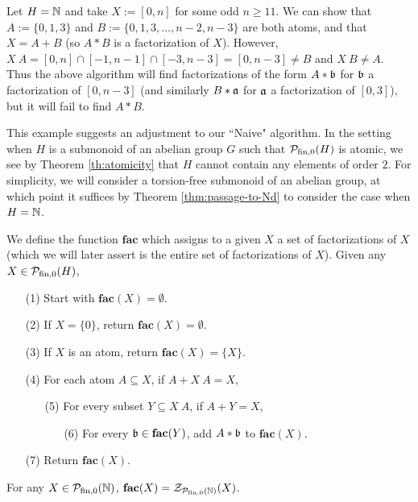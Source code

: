 \begin{eg}
Let $H = \NN$ and take $X := [0,n]$ for some odd $n \ge 11$.
We can show that $A := \{0,1,3\}$ and $B := \{0,1,3,\dots,n-2,n-3\}$ are both atoms, and that $X = A + B$ (so $A*B$ is a factorization of $X$).
However, $X\:A = [0,n] \cap [-1,n-1] \cap [-3,n-3] = [0,n-3] \neq B$ and $X\: B \neq A$.
Thus the above algorithm will find factorizations of the form $A*\bb$ for $\bb$ a factorization of $[0,n-3]$ (and similarly $B*\aa$ for $\aa$ a factorization of $[0,3]$), but it will fail to find $A*B$.
\end{eg} 

This example suggests an adjustment to our ``Naive" algorithm.
In the setting when $H$ is a submonoid of an abelian group $G$ such that $\P_\fon(H)$ is atomic, we see by Theorem \ref{th:atomicity} that $H$ cannot contain any elements of order $2$.
For simplicity, we will consider a torsion-free submonoid of an abelian group, at which point it suffices by Theorem \ref{thm:passage-to-Nd} to consider the case when $H = \NN$.

\begin{defn} \label{def:fac algorithm}
We define the function $\mathbf{fac}$ which assigns to a given $X$ a set of factorizations of $X$ (which we will later assert is the entire set of factorizations of $X$).
Given any $X\in \P_\fon(H)$,
\begin{itemize}
	\item[(1)] Start with $\mathbf{fac}(X) = \emptyset$.
	\item[(2)] If $X = \{0\}$, return $\mathbf{fac}(X) = \emptyset$.
	\item[(3)] If $X$ is an atom, return $\mathbf{fac}(X) = \{X\}$. 
	\item[(4)] For each atom $A \subseteq X$, if $A + X\:A = X$,
	\begin{itemize}
	\item[(5)] For every subset $Y \subseteq X\:A$, if $A+Y = X$,
	\begin{itemize}
		\item[(6)] For every $\bb\in \mathbf{fac}(Y)$, add $A*\bb$ to $\mathbf{fac}(X)$.
	\end{itemize}
\end{itemize}
\item[(7)] Return $\mathbf{fac}(X)$.
\end{itemize}
\end{defn}

\begin{prop}
For any $X\in \PN$, $\mathbf{fac}(X) = \Z_{\PN}(X)$.
\end{prop}

